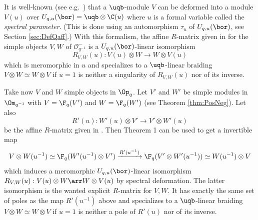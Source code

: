 \documentclass[11pt]{amsart}
\theoremstyle{definition}
\theoremstyle{remark}
\numberwithin{equation}{section}
\begin{document}
It is well-known (see e.g.~\cite{her}) that a $\uqb$-module $V$ can be deformed into a module $V(u)$ over $U_{q,u}(\bor) = \uqb\otimes \C(u)$ where $u$ is a formal variable called the \textit{spectral parameter}. (This is done using an automorphism $\tau_u$ of $U_{q,u}(\bor)$, see Section \ref{sec:DefQaff}.) With this formalism, the affine $R$-matrix given in \cite{her} for the simple objects $V,W$ of $\mathcal{O}_{q^{-1}}^{-}$ is a $U_{q,u}(\bor)$-linear isomorphism
$$R_{V,W}(u) : V(u)\otimes W \rightarrow W\otimes V(u)$$
which is meromorphic in $u$ and specializes to a $\uqb$-linear braiding $V\otimes W\simeq W\otimes V$ if $u=1$ is neither a singularity of $R_{V,W}(u)$ nor of its inverse. \par 
Take now $V$ and $W$ simple objects in $\Op_q$. Let $V'$ and $W'$ be simple modules in $\Om_{q^{-1}}$ with $V=\F_q(V')$ and $W=\F_q(W')$ (see Theorem \ref{thm:PosNeg}). Let also $$R'(u) : W'(u)\otimes V' \rightarrow V'\otimes W'(u)$$
be the affine $R$-matrix given in \cite{her}. Then Theorem 1 can be used to get a invertible map $$V\otimes W(u^{-1}) \simeq \F_q(W'(u^{-1})\otimes V')\xrightarrow{R'(u^{-1})} \F_q(V'\otimes W'(u^{-1})) \simeq W(u^{-1})\otimes V$$
which induces a meromorphic $U_{q,u}(\bor)$-linear isomorphism $R_{V,W}(u):V(u)\otimes W \arr W\otimes V(u)$
by spectral deformation. The latter isomorphism is the wanted explicit $R$-matrix for $V,W$. It has exactly the same set of poles as the map $R'(u^{-1})$ above and specializes to a $\uqb$-linear braiding $V\otimes W \simeq W\otimes V$ if $u=1$ is neither a pole of $R'(u)$ nor of its inverse. \par 
\end{document}

